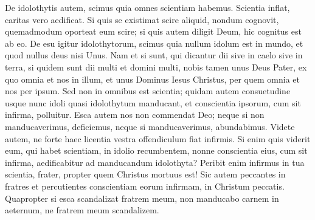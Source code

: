 \begin{biblechapter}
\begin{biblechapter}
\begin{biblechapter}
\begin{biblechapter}
\begin{biblechapter}
\begin{biblechapter}
\begin{biblechapter}
\begin{biblechapter}
\verse De idolothytis autem, scimus quia omnes scientiam habemus. Scientia inflat, caritas vero aedificat. 
\verse Si quis se existimat scire aliquid, nondum cognovit, quemadmodum oporteat eum scire; 
\verse si quis autem diligit Deum, hic cognitus est ab eo. 
\verse De esu igitur idolothytorum, scimus quia nullum idolum est in mundo, et quod nullus deus nisi Unus. 
\verse Nam et si sunt, qui dicantur dii sive in caelo sive in terra, si quidem sunt dii multi et domini multi, 
\verse nobis tamen unus Deus Pater, ex quo omnia et nos in illum, et unus Dominus Iesus Christus, per quem omnia et nos per ipsum.
 \verse Sed non in omnibus est scientia; quidam autem consuetudine usque nunc idoli quasi idolothytum manducant, et conscientia ipsorum, cum sit infirma, polluitur. 
\verse Esca autem nos non commendat Deo; neque si non manducaverimus, deficiemus, neque si manducaverimus, abundabimus. 
\verse Videte autem, ne forte haec licentia vestra offendiculum fiat infirmis. 
\verse Si enim quis viderit eum, qui habet scientiam, in idolio recumbentem, nonne conscientia eius, cum sit infirma, aedificabitur ad manducandum idolothyta? 
\verse Peribit enim infirmus in tua scientia, frater, propter quem Christus mortuus est! 
\verse Sic autem peccantes in fratres et percutientes conscientiam eorum infirmam, in Christum peccatis. 
 \verse Quapropter si esca scandalizat fratrem meum, non manducabo carnem in aeternum, ne fratrem meum scandalizem.
 

\end{biblechapter}
\end{biblechapter}
\end{biblechapter}
\end{biblechapter}
\end{biblechapter}
\end{biblechapter}
\end{biblechapter}
\end{biblechapter}
